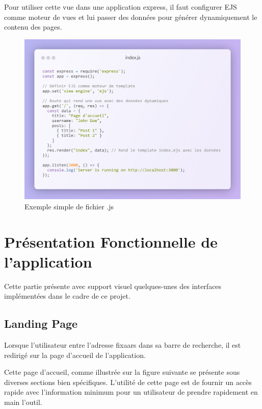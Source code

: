 {\vspace{0.35cm}

Pour utiliser cette vue dans une application express, il faut configurer EJS comme moteur de vues et lui passer des données pour générer dynamiquement le contenu des pages.

\begin{figure}[H]
\begin{center}
\includegraphics[width=15cm]{assets/presentation/ejs2-snippet.png}
\end{center}
\caption{Exemple simple de fichier .js}
\end{figure}


\section{Présentation Fonctionnelle de l'application}

Cette partie présente avec support visuel quelques-unes des interfaces implémentées dans le cadre de ce projet. 

\subsection{Landing Page}

Lorsque l'utilisateur entre l'adresse fixaars dans sa barre de recherche, il est redirigé sur la page d'accueil de l'application. 

\vspace{1cm}

Cette page d'accueil, comme illustrée sur la figure suivante se présente sous diverses sections bien spécifiques. L'utilité de cette page est de fournir un accès rapide avec l'information minimum pour un utilisateur de prendre rapidement en main l'outil. 


}

